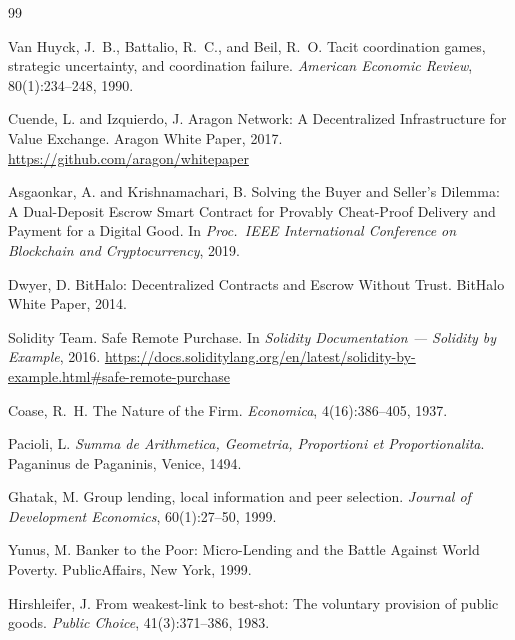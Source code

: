 \documentclass[11pt,a4paper]{article}
\theoremstyle{definition}
\theoremstyle{remark}
\begin{document}

\begin{thebibliography}{99}

Van Huyck, J.~B., Battalio, R.~C., and Beil, R.~O.
\newblock Tacit coordination games, strategic uncertainty, and coordination
  failure.
\newblock \emph{American Economic Review}, 80(1):234--248, 1990.

Cuende, L. and Izquierdo, J.
\newblock Aragon Network: A Decentralized Infrastructure for Value Exchange.
\newblock Aragon White Paper, 2017.
\newblock \url{https://github.com/aragon/whitepaper}

Asgaonkar, A. and Krishnamachari, B.
\newblock Solving the Buyer and Seller's Dilemma: A Dual-Deposit Escrow Smart
  Contract for Provably Cheat-Proof Delivery and Payment for a Digital Good.
\newblock In \emph{Proc.\ IEEE International Conference on Blockchain and
  Cryptocurrency}, 2019.

Dwyer, D.
\newblock BitHalo: Decentralized Contracts and Escrow Without Trust.
\newblock BitHalo White Paper, 2014.

Solidity Team.
\newblock Safe Remote Purchase.
\newblock In \emph{Solidity Documentation --- Solidity by Example}, 2016.
\newblock \url{https://docs.soliditylang.org/en/latest/solidity-by-example.html#safe-remote-purchase}

Coase, R.~H.
\newblock The Nature of the Firm.
\newblock \emph{Economica}, 4(16):386--405, 1937.

Pacioli, L.
\newblock \emph{Summa de Arithmetica, Geometria, Proportioni
  et Proportionalita}.
\newblock Paganinus de Paganinis, Venice, 1494.

Ghatak, M.
\newblock Group lending, local information and peer selection.
\newblock \emph{Journal of Development Economics}, 60(1):27--50, 1999.

Yunus, M.
\newblock Banker to the Poor: Micro-Lending and the Battle Against World
  Poverty.
\newblock PublicAffairs, New York, 1999.

Hirshleifer, J.
\newblock From weakest-link to best-shot: The voluntary provision of public
  goods.
\newblock \emph{Public Choice}, 41(3):371--386, 1983.


\end{thebibliography}
\end{document}
